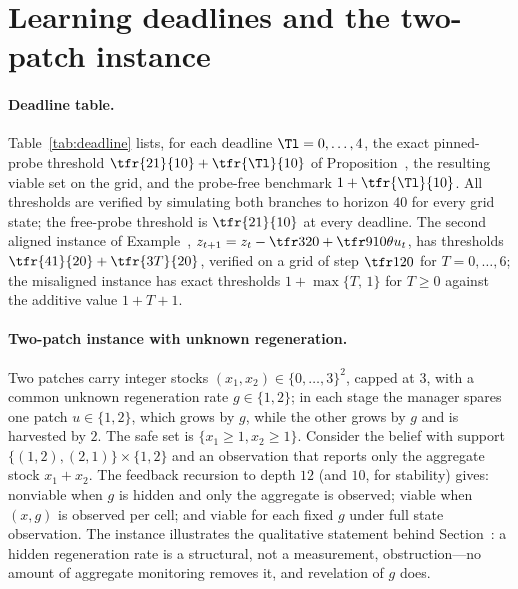 \section{Learning deadlines and the two-patch instance}\label{si:deadline}

\paragraph{Deadline table.} Table~\ref{tab:deadline} lists, for each deadline $\Tl=0,\dots,4$, the exact pinned-probe threshold $\tfr{21}{10}+\tfr{\Tl}{10}$ of Proposition~, the resulting viable set on the grid, and the probe-free benchmark $1+\tfr{\Tl}{10}$. All thresholds are verified by simulating both branches to horizon $40$ for every grid state; the free-probe threshold is $\tfr{21}{10}$ at every deadline. The second aligned instance of Example~, $z_{t+1}=z_t-\tfr3{20}+\tfr9{10}\theta u_t$, has thresholds $\tfr{41}{20}+\tfr{3T}{20}$, verified on a grid of step $\tfr1{20}$ for $T=0,\dots,6$; the misaligned instance has exact thresholds $1+\max\{T,\,1\}$ for $T\ge0$ against the additive value $1+T+1$.

\begin{table}[h]
\centering\footnotesize
\caption{Pinned-probe learning deadlines on the declining instance and the probe-free benchmark.}
\label{tab:deadline}

\end{table}

\paragraph{Two-patch instance with unknown regeneration.} Two patches carry integer stocks $(x_1,x_2)\in\{0,\dots,3\}^2$, capped at $3$, with a common unknown regeneration rate $g\in\{1,2\}$; in each stage the manager spares one patch $u\in\{1,2\}$, which grows by $g$, while the other grows by $g$ and is harvested by $2$. The safe set is $\{x_1\ge1,x_2\ge1\}$. Consider the belief with support $\{(1,2),(2,1)\}\times\{1,2\}$ and an observation that reports only the aggregate stock $x_1+x_2$. The feedback recursion to depth $12$ (and $10$, for stability) gives: nonviable when $g$ is hidden and only the aggregate is observed; viable when $(x,g)$ is observed per cell; and viable for each fixed $g$ under full state observation. The instance illustrates the qualitative statement behind Section~: a hidden regeneration rate is a structural, not a measurement, obstruction---no amount of aggregate monitoring removes it, and revelation of $g$ does.
